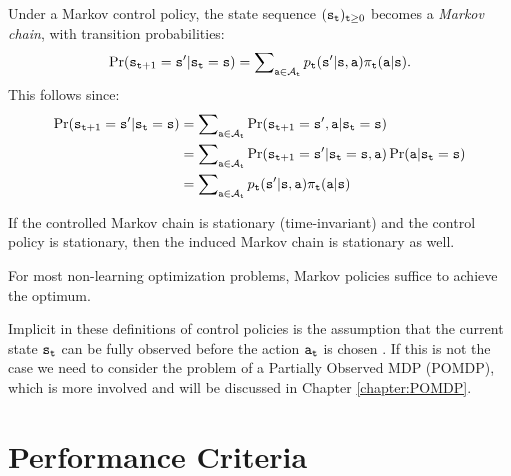Under a Markov control policy, the state sequence
${({{\tt s}_{\tt t}})_{{\tt t} \ge 0}}$ becomes a \emph{Markov chain},
with transition probabilities:
\[\Pr({{\tt s}_{{\tt t} + 1}} = {\tt s}'|{{\tt s}_{\tt t}} = {\tt s}) = \sum\nolimits_{{\tt a} \in {\mathcal{A}_{\tt t}}} {{p_{\tt t}}} ({\tt s}'|{\tt s},{\tt a}){\pi _{\tt t}}({\tt a}|{\tt s}).\]
This follows since:
\begin{align*}
\Pr({{\tt s}_{{\tt t} + 1}} = {\tt s}'|{{\tt s}_{\tt t}} = {\tt s}) & =
\sum\nolimits_{{\tt a} \in {\mathcal{A}_{\tt t}}} \Pr({{\tt s}_{{\tt t} +
1}} = {\tt s}', {\tt a}|{{\tt s}_{\tt t}} = {\tt s})  \\
& =\sum\nolimits_{{\tt a} \in {\mathcal{A}_{\tt t}}} \Pr({{\tt s}_{{\tt t}
+ 1}} = {\tt s}'|{{\tt s}_{\tt t}} = {\tt s},{\tt a}) \Pr({\tt a} |
{\tt s}_{\tt t}={\tt s}) \\
&= \sum\nolimits_{{\tt a} \in {\mathcal{A}_{\tt t}}} {{p_{\tt t}}}
({\tt s}'|{\tt s},{\tt a}){\pi _{\tt t}}({\tt a}|{\tt s})
\end{align*}


If the controlled Markov chain is stationary (time-invariant) and the control policy is stationary, then the induced Markov chain is stationary as well.



\begin{remark}
For most non-learning optimization problems, Markov policies suffice to achieve the optimum.
\end{remark}
\begin{remark}
Implicit in these definitions of control policies is the assumption
that the current state ${{\tt s}_{\tt t}}$ can be fully observed
before the action ${{\tt a}_{\tt t}}$ is chosen . If this is not the
case we need to consider the problem of a Partially Observed MDP
(POMDP), which is more involved and will be discussed in Chapter \ref{chapter:POMDP}.
\end{remark}

\section{Performance Criteria}

